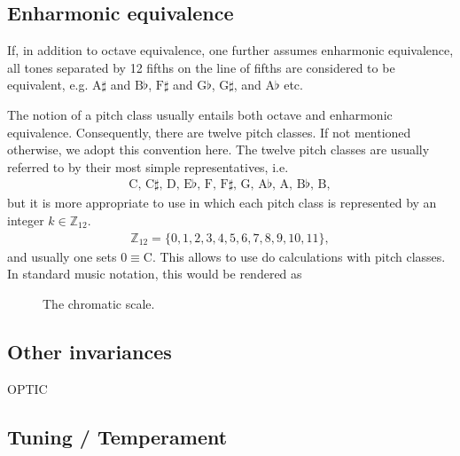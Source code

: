 \documentclass[letterpaper,10pt,english]{sphinxmanual}
\begin{document}
\subsection{Enharmonic equivalence}
\label{\detokenize{1_fundamentals:enharmonic-equivalence}}
\sphinxAtStartPar
If, in addition to octave equivalence, one further assumes enharmonic equivalence,
all tones separated by 12 fifths on the line of fifths
are considered to be equivalent, e.g. \(\text{A}\sharp\) and \(\text{B}\flat\),
\(\text{F}\sharp\) and \(\text{G}\flat\), \(\text{G}\sharp\), and \(\text{A}\flat\) etc.

\sphinxAtStartPar
The notion of a pitch class usually entails both octave and enharmonic equivalence.
Consequently, there are twelve pitch classes. If not mentioned otherwise, we adopt this convention here.
The twelve pitch classes are usually referred to by their most simple representatives, i.e.
\begin{equation*}
\begin{split}\text{C, C$\sharp$, D, E$\flat$, F, F$\sharp$, G, A$\flat$, A, B$\flat$, B},\end{split}
\end{equation*}
\sphinxAtStartPar
but it is more appropriate to use  in which each pitch class is represented
by an integer \(k \in \mathbb{Z}_{12}\).
\begin{equation*}
\begin{split}\mathbb{Z}_{12}=\{0, 1, 2, 3, 4, 5, 6, 7, 8, 9, 10, 11\},\end{split}
\end{equation*}
\sphinxAtStartPar
and usually one sets \(0\equiv \text{C}\). This allows to use 
do calculations with pitch classes. In standard music notation, this would be rendered as

\begin{figure}[htbp]
\centering
\capstart

\noindent{}
\caption{The chromatic scale.}\label{\detokenize{1_fundamentals:id9}}\end{figure}


\subsection{Other invariances}
\label{\detokenize{1_fundamentals:other-invariances}}
\sphinxAtStartPar
OPTIC


\subsection{Tuning / Temperament}
\label{\detokenize{1_fundamentals:tuning-temperament}}
\end{document}
